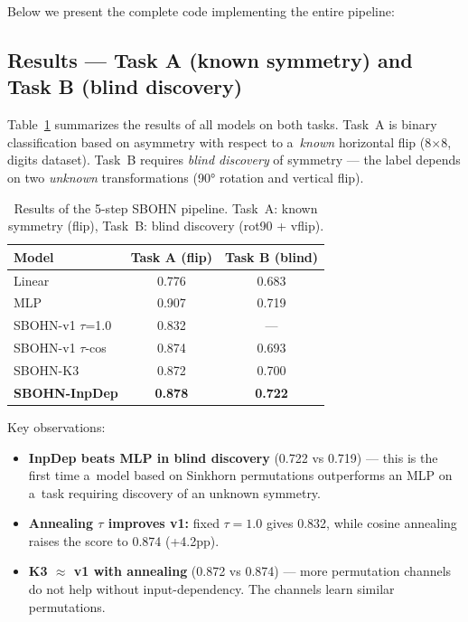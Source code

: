 \documentclass[11pt,a4paper]{report}
\begin{document}
Below we present the complete code implementing the entire pipeline:

\noindent{}



\subsection{Results --- Task A (known symmetry) and Task B (blind discovery)}

Table~\ref{tab:sbohn_5steps} summarizes the results of all models on both tasks.
Task~A is binary classification based on asymmetry with respect to a~\emph{known} horizontal flip (8$\times$8, digits dataset).
Task~B requires \emph{blind discovery} of symmetry --- the label depends on two \emph{unknown} transformations (90° rotation and vertical flip).

\begin{table}[h]
\centering
\caption{Results of the 5-step SBOHN pipeline. Task~A: known symmetry (flip), Task~B: blind discovery (rot90 + vflip).}
\label{tab:sbohn_5steps}
\begin{tabular}{lcc}
\hline
\textbf{Model} & \textbf{Task A (flip)} & \textbf{Task B (blind)} \\
\hline
Linear             & 0.776 & 0.683 \\
MLP                & 0.907 & 0.719 \\
SBOHN-v1 $\tau$=1.0  & 0.832 & --- \\
SBOHN-v1 $\tau$-cos   & 0.874 & 0.693 \\
SBOHN-K3           & 0.872 & 0.700 \\
\textbf{SBOHN-InpDep} & \textbf{0.878} & \textbf{0.722} \\
\hline
\end{tabular}
\end{table}

Key observations:
\begin{itemize}
    \item \textbf{InpDep beats MLP in blind discovery} (0.722 vs 0.719) --- this is the first time a~model based on Sinkhorn permutations outperforms an MLP on a~task requiring discovery of an unknown symmetry.
    \item \textbf{Annealing $\tau$ improves v1:} fixed $\tau=1.0$ gives 0.832, while cosine annealing raises the score to 0.874 (+4.2pp).
    \item \textbf{K3 $\approx$ v1 with annealing} (0.872 vs 0.874) --- more permutation channels do not help without input-dependency. The channels learn similar permutations.
\end{itemize}
\end{document}
